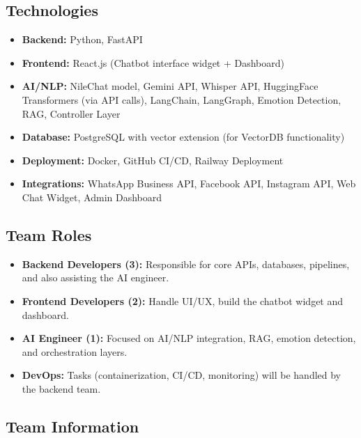 \documentclass[20pt,a4paper]{article}
\begin{document}
\subsection*{Technologies}
\begin{itemize}[leftmargin=*]
    \item \textbf{Backend:} Python, FastAPI 
    \item \textbf{Frontend:} React.js (Chatbot interface widget + Dashboard) 
    \item \textbf{AI/NLP:} NileChat model, Gemini API, Whisper API, HuggingFace Transformers (via API calls), LangChain, LangGraph, Emotion Detection, RAG, Controller Layer 
    \item \textbf{Database:} PostgreSQL with vector extension (for VectorDB functionality)  
    \item \textbf{Deployment:} Docker, GitHub CI/CD, Railway Deployment
    \item \textbf{Integrations:} WhatsApp Business API, Facebook API, Instagram API, Web Chat Widget, Admin Dashboard
\end{itemize}

\subsection*{Team Roles}
\begin{itemize}[leftmargin=*]
    \item \textbf{Backend Developers (3):} Responsible for core APIs, databases, pipelines, and also assisting the AI engineer.  
    \item \textbf{Frontend Developers (2):} Handle UI/UX, build the chatbot widget and dashboard.  
    \item \textbf{AI Engineer (1):} Focused on AI/NLP integration, RAG, emotion detection, and orchestration layers.  
    \item \textbf{DevOps:} Tasks (containerization, CI/CD, monitoring) will be handled by the backend team.  
\end{itemize}

\subsection*{Team Information}
\end{document}
